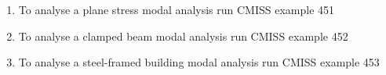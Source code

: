 \begin{enumerate}
  \item To analyse a plane stress modal analysis run CMISS example 451
  \item To analyse a clamped beam modal analysis run CMISS example 452
  \item To analyse a steel-framed building modal analysis run CMISS example 453
\end{enumerate}


